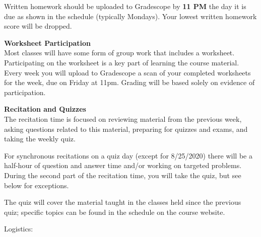 \documentclass[12pt]{article}
\renewcommand{\emph}[1]{\textsf{\textbf{#1}}}
\newcommand{\localhead}[1]{\par\smallskip\textbf{#1}\nobreak\\}%
\def\heading#1{\localhead{\large\emph{#1}}}
\begin{document}
Written homework should be uploaded to Gradescope by {\bf 11 PM} the day
it is due as shown in the schedule (typically Mondays).  Your lowest written homework score will be dropped.

\heading{Worksheet Participation}

Most classes will have some form of group work that includes
a worksheet.  Participating on the worksheet is a key part
of learning the course material.  Every week you will upload to 
Gradescope a scan of your completed worksheets for the week,
due on Friday at 11pm.  Grading will be based solely on 
evidence of participation.

\heading{Recitation and Quizzes}
The recitation time is focused on reviewing material from the previous week, asking questions related to this material, preparing for quizzes and exams, and taking the weekly quiz.

For synchronous recitations on a quiz day (except for 8/25/2020) there will be a half-hour of question and answer time and/or working on targeted problems. During the second part of the recitation time, you will take the quiz, but see below for exceptions.

The quiz will cover the material taught in the classes held since the previous quiz; specific topics can be found in the schedule on the course website.  

Logistics:
\end{document}
